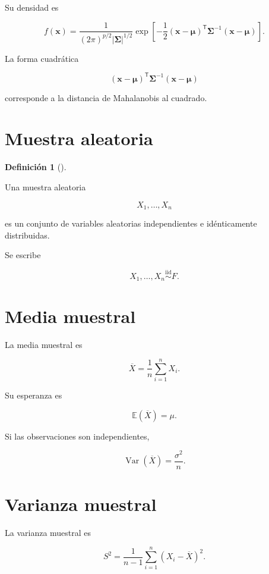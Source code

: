 \documentclass[
  spanish,
  11pt,
  letterpaper,
  DIV=11,
  numbers=noendperiod]{scrreprt}
\theoremstyle{definition}
\newtheorem{definition}{Definición}[chapter]
\theoremstyle{plain}
\theoremstyle{definition}
\theoremstyle{remark}
\begin{document}
Su densidad es

\[
f(\mathbf{x})
=
\frac{
1
}{
(2\pi)^{p/2}
|\boldsymbol{\Sigma}|^{1/2}
}
\exp
\left[
-\frac{1}{2}
(\mathbf{x}-\boldsymbol{\mu})^{\mathsf T}
\boldsymbol{\Sigma}^{-1}
(\mathbf{x}-\boldsymbol{\mu})
\right].
\]

La forma cuadrática

\[
(\mathbf{x}-\boldsymbol{\mu})^{\mathsf T}
\boldsymbol{\Sigma}^{-1}
(\mathbf{x}-\boldsymbol{\mu})
\]

corresponde a la distancia de Mahalanobis al cuadrado.

\section{Muestra aleatoria}\label{muestra-aleatoria}

\begin{definition}[]\protect\hypertarget{def-muestra-aleatoria}{}\label{def-muestra-aleatoria}

Una muestra aleatoria

\[
X_1,\ldots,X_n
\]

es un conjunto de variables aleatorias independientes e idénticamente
distribuidas.

\end{definition}

Se escribe

\[
X_1,\ldots,X_n
\overset{\text{iid}}{\sim}
F.
\]

\section{Media muestral}\label{media-muestral}

La media muestral es

\[
\overline{X}
=
\frac{1}{n}
\sum_{i=1}^{n}X_i.
\]

Su esperanza es

\[
\mathbb{E}(\overline{X})
=
\mu.
\]

Si las observaciones son independientes,

\[
\operatorname{Var}(\overline{X})
=
\frac{\sigma^2}{n}.
\]

\section{Varianza muestral}\label{varianza-muestral}

La varianza muestral es

\[
S^2
=
\frac{1}{n-1}
\sum_{i=1}^{n}
(X_i-\overline{X})^2.
\]
\end{document}
